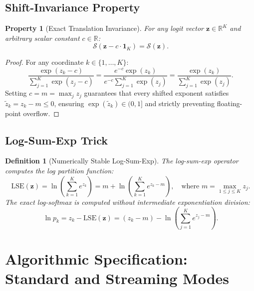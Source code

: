 \documentclass[11pt]{article}
\newtheorem{definition}{Definition}
\newtheorem{property}{Property}
\begin{document}
\subsection{Shift-Invariance Property}
\begin{property}[Exact Translation Invariance]
\label{prop:shift_inv}
For any logit vector $\mathbf{z} \in \mathbb{R}^K$ and arbitrary scalar constant $c \in \mathbb{R}$:
\begin{equation}
\mathcal{S}(\mathbf{z} - c \cdot \mathbf{1}_K) = \mathcal{S}(\mathbf{z}).
\end{equation}
\end{property}
\begin{proof}
For any coordinate $k \in \{1, \dots, K\}$:
\begin{equation}
\frac{\exp(z_k - c)}{\sum_{j=1}^K \exp(z_j - c)} = \frac{e^{-c} \exp(z_k)}{e^{-c} \sum_{j=1}^K \exp(z_j)} = \frac{\exp(z_k)}{\sum_{j=1}^K \exp(z_j)}.
\end{equation}
Setting $c = m = \max_{j} z_j$ guarantees that every shifted exponent satisfies $\tilde{z}_k = z_k - m \le 0$, ensuring $\exp(\tilde{z}_k) \in (0, 1]$ and strictly preventing floating-point overflow.
\end{proof}

\subsection{Log-Sum-Exp Trick}
\begin{definition}[Numerically Stable Log-Sum-Exp]
The log-sum-exp operator computes the log partition function:
\begin{equation}
\label{eq:lse}
\text{LSE}(\mathbf{z}) = \ln \left( \sum_{k=1}^K e^{z_k} \right) = m + \ln \left( \sum_{k=1}^K e^{z_k - m} \right), \quad \text{where } m = \max_{1 \le j \le K} z_j.
\end{equation}
The exact log-softmax is computed without intermediate exponentiation division:
\begin{equation}
\ln p_k = z_k - \text{LSE}(\mathbf{z}) = (z_k - m) - \ln \left( \sum_{j=1}^K e^{z_j - m} \right).
\end{equation}
\end{definition}

\section{Algorithmic Specification: Standard and Streaming Modes}
\label{sec:algorithm}
\end{document}
